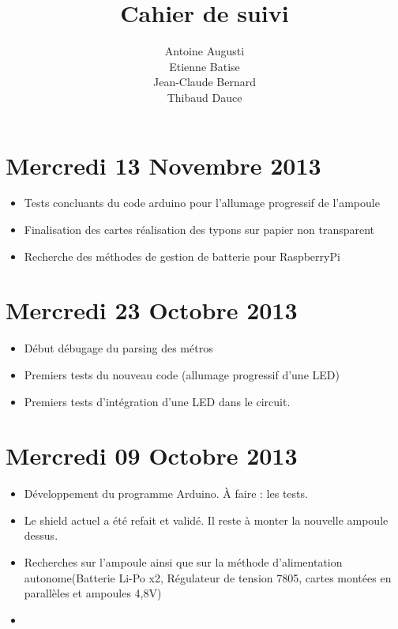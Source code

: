 \documentclass[a4paper, 12pt, french]{article}
\title{Cahier de suivi}
\author{Antoine Augusti\\ Etienne Batise\\ Jean-Claude Bernard\\ Thibaud Dauce}
\begin{document}
\maketitle

	\section*{Mercredi 13 Novembre 2013 } %
	\label{sec:mercredi_13_octobre_2013 }
	\begin{itemize}
		\item Tests concluants du code arduino pour l'allumage progressif de l'ampoule
		\item Finalisation des cartes réalisation des typons sur papier non transparent
		\item Recherche des méthodes de gestion de batterie pour RaspberryPi
	\end{itemize}


	\section*{Mercredi 23 Octobre 2013 } %
	\label{sec:mercredi_23_octobre_2013}
	\begin{itemize}
		\item Début débugage du parsing des métros 
		\item Premiers tests du nouveau code (allumage progressif d'une LED)
		\item Premiers tests d'intégration d'une LED dans le circuit.
	\end{itemize}
	

	\section*{Mercredi 09 Octobre 2013} %
	\label{sec:mercredi_09_octobre_2013}
	\begin{itemize}
		\item Développement du programme Arduino. À faire : les tests.
		\item Le shield actuel a été refait et validé. Il reste à monter la nouvelle ampoule dessus.
		\item Recherches sur l'ampoule ainsi que sur la méthode d'alimentation autonome(Batterie Li-Po x2, Régulateur de tension 7805, cartes montées en parallèles et ampoules 4,8V)
		\item
	\end{itemize}
\end{document}
